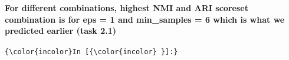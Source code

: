 \documentclass[11pt]{article}
\begin{document}
    \begin{center}
    \end{center}
    { \hspace*{\fill} \\}
    
    \begin{center}
    \end{center}
    { \hspace*{\fill} \\}
    
    \begin{center}
    \end{center}
    { \hspace*{\fill} \\}
    
    \begin{center}
    \end{center}
    { \hspace*{\fill} \\}
    
    \paragraph{For different combinations, highest NMI and ARI scoreset
combination is for eps = 1 and min\_samples = 6 which is what we
predicted earlier (task
2.1)}\label{for-different-combinations-highest-nmi-and-ari-scoreset-combination-is-for-eps-1-and-minux5fsamples-6-which-is-what-we-predicted-earlier-task-2.1}

    \begin{Verbatim}[commandchars=\\\{\}]
{\color{incolor}In [{\color{incolor} }]:} 
\end{Verbatim}


    
    
    
    
\end{document}
